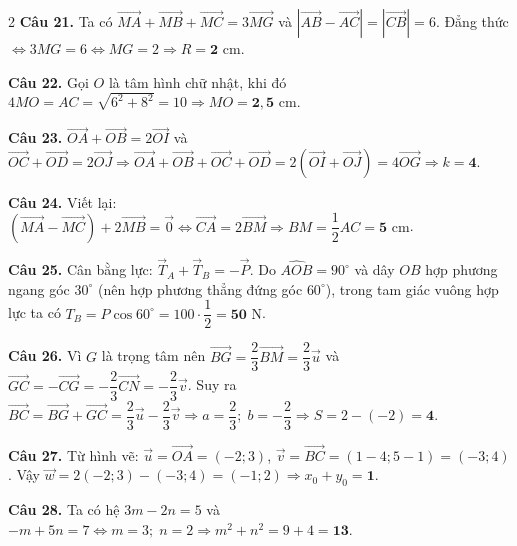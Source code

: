 \documentclass[12pt,a4paper]{article}
\begin{document}
\begin{multicols}{2}
\textbf{Câu 21.} Ta có $\vec{MA} + \vec{MB} + \vec{MC} = 3\vec{MG}$ và $|\vec{AB} - \vec{AC}| = |\vec{CB}| = 6$. Đẳng thức $\Leftrightarrow 3MG = 6 \Leftrightarrow MG = 2 \Rightarrow R = \mathbf{2}\text{ cm}$.\par\vspace{3pt}

\textbf{Câu 22.} Gọi $O$ là tâm hình chữ nhật, khi đó $4MO = AC = \sqrt{6^2 + 8^2} = 10 \Rightarrow MO = \mathbf{2{,}5}\text{ cm}$.\par\vspace{3pt}

\textbf{Câu 23.} $\vec{OA} + \vec{OB} = 2\vec{OI}$ và $\vec{OC} + \vec{OD} = 2\vec{OJ} \Rightarrow \vec{OA}+\vec{OB}+\vec{OC}+\vec{OD} = 2(\vec{OI}+\vec{OJ}) = 4\vec{OG} \Rightarrow k = \mathbf{4}$.\par\vspace{3pt}

\textbf{Câu 24.} Viết lại: $(\vec{MA} - \vec{MC}) + 2\vec{MB} = \vec{0} \Leftrightarrow \vec{CA} = 2\vec{BM} \Rightarrow BM = \dfrac{1}{2}AC = \mathbf{5}\text{ cm}$.\par\vspace{3pt}

\textbf{Câu 25.} Cân bằng lực: $\vec{T}_A + \vec{T}_B = -\vec{P}$. Do $\widehat{AOB} = 90^\circ$ và dây $OB$ hợp phương ngang góc $30^\circ$ (nên hợp phương thẳng đứng góc $60^\circ$), trong tam giác vuông hợp lực ta có $T_B = P\cos 60^\circ = 100 \cdot \dfrac{1}{2} = \mathbf{50}\text{ N}$.\par\vspace{3pt}

\textbf{Câu 26.} Vì $G$ là trọng tâm nên $\vec{BG} = \dfrac{2}{3}\vec{BM} = \dfrac{2}{3}\vec{u}$ và $\vec{GC} = -\vec{CG} = -\dfrac{2}{3}\vec{CN} = -\dfrac{2}{3}\vec{v}$. Suy ra $\vec{BC} = \vec{BG} + \vec{GC} = \dfrac{2}{3}\vec{u} - \dfrac{2}{3}\vec{v} \Rightarrow a = \dfrac{2}{3};\; b = -\dfrac{2}{3} \Rightarrow S = 2 - (-2) = \mathbf{4}$.\par\vspace{3pt}

\textbf{Câu 27.} Từ hình vẽ: $\vec{u} = \vec{OA} = (-2; 3)$, $\vec{v} = \vec{BC} = (1-4; 5-1) = (-3; 4)$. Vậy $\vec{w} = 2(-2; 3) - (-3; 4) = (-1; 2) \Rightarrow x_0 + y_0 = \mathbf{1}$.\par\vspace{3pt}

\textbf{Câu 28.} Ta có hệ $3m - 2n = 5$ và $-m + 5n = 7 \Leftrightarrow m = 3;\; n = 2 \Rightarrow m^2 + n^2 = 9 + 4 = \mathbf{13}$.\par\vspace{3pt}


\end{multicols}
\end{document}
